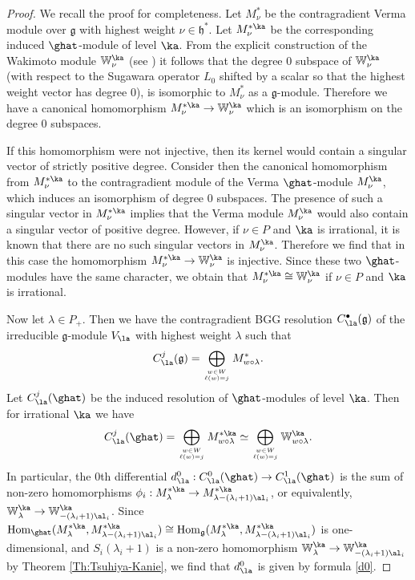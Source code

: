\documentclass{amsart}
\newcommand{\Wak}[2]{\mathbb{W}_{#1}^{#2}}
\newcommand{\+}{\mathop{\oplus}}
\renewcommand{\*}{{\otimes}}
\newcommand{\mf}{\mathfrak}
\newcommand{\g}{\mf{g}}
\newcommand{\h}{\mf{h}}
\newcommand{\lam}{\lambda}
\DeclareMathOperator{\Hom}{Hom}
\theoremstyle{theorem}
\theoremstyle{remark}
\numberwithin{equation}{section}
\begin{document}
\begin{proof}
We recall the proof for completeness. Let $M^*_\nu$ be the
contragradient Verma module over $\g$ with highest weight $\nu \in
\h^*$. Let $M^{*\ka}_\nu$ be the corresponding induced $\ghat$-module
of level $\ka$. From the explicit construction of the Wakimoto module
$\Wak{\nu}{\ka}$ (see \cite{Fre05}) it follows that the degree
0 subspace of $\Wak{\nu}{\ka}$ (with respect to the Sugawara operator
$L_0$ shifted by a scalar so that the highest weight vector has degree
0), is isomorphic to $M^*_\nu$ as a $\g$-module. Therefore we have a
canonical homomorphism $M^{*\ka}_\nu \to \Wak{\nu}{\ka}$ which is an
isomorphism on the degree 0 subspaces.

If this homomorphism were not injective, then its kernel would contain
a singular vector of strictly positive degree. Consider then the
canonical homomorphism from $M^{*\ka}_\nu$ to the contragradient
module of the Verma $\ghat$-module $M^\ka_\nu$, which induces an
isomorphism of degree $0$ subspaces. The presence of such a singular
vector in $M^{*\ka}_\nu$ implies that the Verma module $M^\ka_\nu$
would also contain a singular vector of positive degree. However, if
$\nu \in P$ and $\ka$ is irrational, it is known that there are no
such singular vectors in $M^\ka_\nu$. Therefore we find that in this
case the homomorphism $M^{*\ka}_\nu \to \Wak{\nu}{\ka}$ is injective.
Since these two $\ghat$-modules have the same character, we obtain
that $M^{*\ka}_\nu \cong \Wak{\nu}{\ka}$ if $\nu \in P$ and $\ka$ is
irrational.

Now let $\lam \in P_+$. Then we have the contragradient BGG resolution
$C^\bullet_\la(\g)$ of the irreducible $\g$-module $V_\la$ with
highest weight $\lam$ such that
$$
C^j_\la(\g)=\bigoplus_{w\in W\atop \ell(w)=j} M^*_{w\circ \lam}.
$$
Let $C^j_\la(\ghat)$ be the induced resolution of $\ghat$-modules of
level $\ka$. Then for irrational $\ka$ we have
$$
C^j_\la(\ghat)=\bigoplus_{w\in W\atop \ell(w)=j} M^{*\ka}_{w\circ
  \lam} \simeq \bigoplus_{w\in W\atop \ell(w)=j} \Wak{w\circ
  \lam}{\ka}.
$$
In particular, the 0th differential $d^0_\la: C^0_\la(\ghat) \to
C^1_\la(\ghat)$ is the sum of non-zero homomorphisms $\phi_i: M^{*\ka}_\lam
\to M^{*\ka}_{\lam-(\lam_i+1)\al_i}$, or equivalently, $\Wak{\lam}{\ka} \to
\Wak{-(\lam_i+1)\al_i}{\ka}$. Since
$\Hom_{\ghat}(M^{*\ka}_\lam,M^{*\ka}_{\lam-(\lam_i+1)\al_i}) \cong
\Hom_{\g}(M^{*\ka}_\lam,M^{*\ka}_{\lam-(\lam_i+1)\al_i})$ is one-dimensional,
and $S_i(\lam_i+1)$ is a non-zero homomorphism $\Wak{\lam}{\ka} \to
\Wak{-(\lam_i+1)\al_i}{\ka}$ by Theorem \ref{Th:Tsuhiya-Kanie}, we
find that $d^0_\la$ is given by formula \eqref{d0}.
\end{proof}
\end{document}
